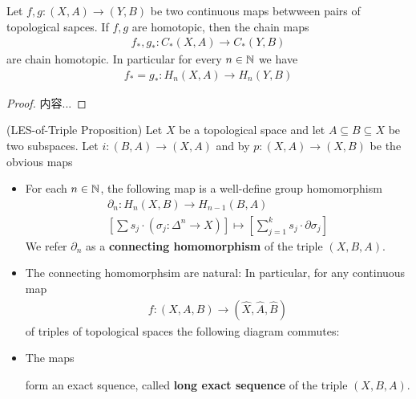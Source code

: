 \documentclass[Total.tex]{subfiles}
\begin{document}
			\begin{proposition}
				Let $f,g:(X,A)\rightarrow (Y,B)$ be two continuous maps betwween pairs of topological sapces. If $f,g$ are homotopic, then the chain maps
				\begin{gather*}
					f_*,g_*:C_*(X,A)\rightarrow C_*(Y,B)
				\end{gather*}
				are chain homotopic. In particular for every $n\in \mathbb{N}$ we have
				\begin{gather*}
					f_*=g_*:H_n(X,A)\rightarrow H_n(Y,B)
				\end{gather*}
			\end{proposition}
			\begin{proof}
				内容...
			\end{proof}
				\begin{proposition}
				(LES-of-Triple Proposition) Let $X$ be a topological space and let $A\subseteq B\subseteq X$ be two subspaces. Let $i:(B,A)\rightarrow (X,A)$ and by $p:(X,A)\rightarrow (X,B)$ be the obvious maps
				\begin{itemize}
					\item For each $n\in \mathbb{N}$, the following map is a well-define group homomorphism
					\begin{gather*}
						\partial_n:H_n(X,B)\rightarrow H_{n-1}(B,A)\\
						[\sum s_j\cdot (\sigma_j:\Delta^n\rightarrow X)]\mapsto [\sum_{j=1}^k s_j\cdot \partial \sigma_j]
					\end{gather*}
					We refer $\partial_n$ as a \textbf{connecting homomorphism} of the triple $(X,B,A)$.
					\item The connecting homomorphsim are natural: In particular, for any continuous map
					\begin{gather*}
						f:(X,A,B)\rightarrow (\hat{X},\hat{A},\hat{B})
					\end{gather*}
					of triples of topological spaces the following diagram commutes:
					\begin{center}
					\end{center}
					\item The maps
					\begin{center}
					\end{center}
					form an exact squence, called \textbf{long exact sequence} of the triple $(X,B,A)$.
				\end{itemize}
			\end{proposition}
\end{document}
